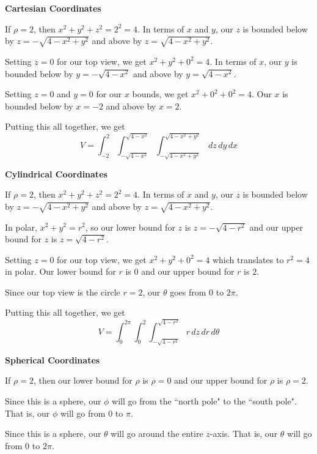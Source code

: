 \documentclass{article}
\begin{document}
{}\textbf{Cartesian Coordinates}

If $\rho=2$, then $x^2+y^2+z^2=2^2=4$. In terms of $x$ and $y$, our $z$ is bounded below by $z=-\sqrt{4-x^2+y^2}$ and above by $z=\sqrt{4-x^2+y^2}$.

Setting $z=0$ for our top view, we get $x^2+y^2+0^2=4$. In terms of $x$, our $y$ is bounded below by $y=-\sqrt{4-x^2}$ and above by $y=\sqrt{4-x^2}$.

Setting $z=0$ and $y=0$ for our $x$ bounds, we get $x^2+0^2+0^2=4$. Our $x$ is bounded below by $x=-{2}$ and above by $x={2}$.

Putting this all together, we get
\begin{equation*}
    V=\int_{-{2}}^{{2}}\int_{-\sqrt{4-x^2}}^{\sqrt{4-x^2}}\int_{-\sqrt{4-x^2+y^2}}^{\sqrt{4-x^2+y^2}}\,dz\,dy\,dx
\end{equation*}
{}\textbf{Cylindrical Coordinates}

If $\rho=2$, then $x^2+y^2+z^2=2^2=4$. In terms of $x$ and $y$, our $z$ is bounded below by $z=-\sqrt{4-x^2+y^2}$ and above by $z=\sqrt{4-x^2+y^2}$.

In polar, $x^2+y^2=r^2$, so our lower bound for $z$ is $z=-\sqrt{4-r^2}$ and our upper bound for $z$ is $z=\sqrt{4-r^2}$.

Setting $z=0$ for our top view, we get $x^2+y^2+0^2=4$ which translates to $r^2=4$ in polar. Our lower bound for $r$ is $0$ and our upper bound for $r$ is $2$.

Since our top view is the circle $r=2$, our $\theta$ goes from $0$ to $2\pi$.

Putting this all together, we get
\begin{equation*}
    V=\int_0^{2\pi}\int_0^2\int_{-\sqrt{4-r^2}}^{\sqrt{4-r^2}}r\,dz\,dr\,d\theta
\end{equation*}
{}\textbf{Spherical Coordinates}

If $\rho=2$, then our lower bound for $\rho$ is $\rho=0$ and our upper bound for $\rho$ is $\rho =2$.

Since this is a sphere, our $\phi$ will go from the ``north pole" to the ``south pole". That is, our $\phi$ will go from $0$ to $\pi$.

Since this is a sphere, our $\theta$ will go around the entire $z$-axis. That is, our $\theta$ will go from $0$ to $2\pi$.
\end{document}
